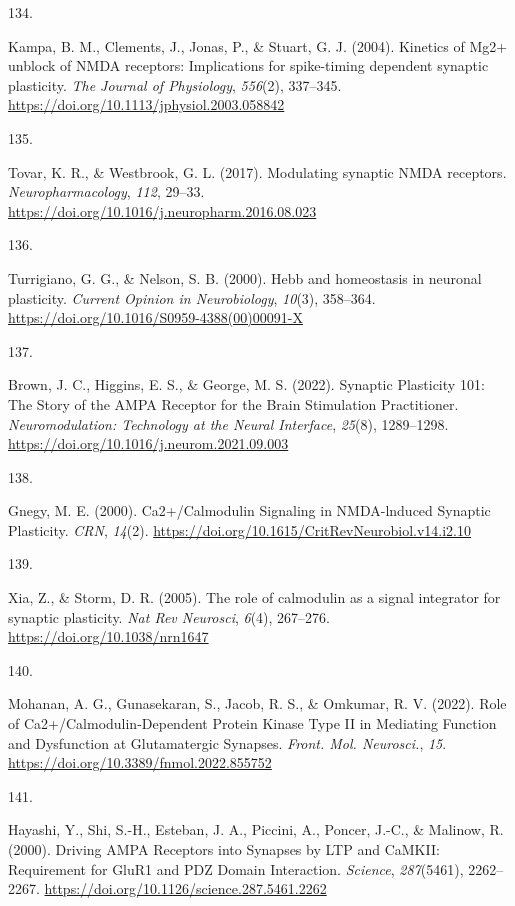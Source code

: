 \documentclass[
  11pt,
  letterpaper,
]{scrreprt}
\newlength{\cslhangindent}
\newlength{\csllabelwidth}
\newenvironment{CSLReferences}[2] %
 {\begin{list}{}{%
  \setlength{\itemindent}{0pt}
  \setlength{\leftmargin}{0pt}
  \setlength{\parsep}{0pt}
  \ifodd #1
   \setlength{\leftmargin}{\cslhangindent}
   \setlength{\itemindent}{-1\cslhangindent}
  \fi
  \setlength{\itemsep}{#2\baselineskip}}}
 {\end{list}}
\newcommand{\CSLLeftMargin}[1]{\parbox[t]{\csllabelwidth}{\strut#1\strut}}
\newcommand{\CSLRightInline}[1]{\parbox[t]{\linewidth - \csllabelwidth}{\strut#1\strut}}
\begin{document}
\begin{CSLReferences}{0}{0}
\CSLLeftMargin{134. }%
\CSLRightInline{Kampa, B. M., Clements, J., Jonas, P., \& Stuart, G. J.
(2004). Kinetics of {Mg2}+ unblock of {NMDA} receptors: Implications for
spike-timing dependent synaptic plasticity. \emph{The Journal of
Physiology}, \emph{556}(2), 337--345.
\url{https://doi.org/10.1113/jphysiol.2003.058842}}

\CSLLeftMargin{135. }%
\CSLRightInline{Tovar, K. R., \& Westbrook, G. L. (2017). Modulating
synaptic {NMDA} receptors. \emph{Neuropharmacology}, \emph{112}, 29--33.
\url{https://doi.org/10.1016/j.neuropharm.2016.08.023}}

\CSLLeftMargin{136. }%
\CSLRightInline{Turrigiano, G. G., \& Nelson, S. B. (2000). Hebb and
homeostasis in neuronal plasticity. \emph{Current Opinion in
Neurobiology}, \emph{10}(3), 358--364.
\url{https://doi.org/10.1016/S0959-4388(00)00091-X}}

\CSLLeftMargin{137. }%
\CSLRightInline{Brown, J. C., Higgins, E. S., \& George, M. S. (2022).
Synaptic {Plasticity} 101: {The Story} of the {AMPA Receptor} for the
{Brain Stimulation Practitioner}. \emph{Neuromodulation: Technology at
the Neural Interface}, \emph{25}(8), 1289--1298.
\url{https://doi.org/10.1016/j.neurom.2021.09.003}}

\CSLLeftMargin{138. }%
\CSLRightInline{Gnegy, M. E. (2000). Ca2+/{Calmodulin Signaling} in
{NMDA-lnduced Synaptic Plasticity}. \emph{CRN}, \emph{14}(2).
\url{https://doi.org/10.1615/CritRevNeurobiol.v14.i2.10}}

\CSLLeftMargin{139. }%
\CSLRightInline{Xia, Z., \& Storm, D. R. (2005). The role of calmodulin
as a signal integrator for synaptic plasticity. \emph{Nat Rev Neurosci},
\emph{6}(4), 267--276. \url{https://doi.org/10.1038/nrn1647}}

\CSLLeftMargin{140. }%
\CSLRightInline{Mohanan, A. G., Gunasekaran, S., Jacob, R. S., \&
Omkumar, R. V. (2022). Role of {Ca2}+/{Calmodulin-Dependent Protein
Kinase Type II} in {Mediating Function} and {Dysfunction} at
{Glutamatergic Synapses}. \emph{Front. Mol. Neurosci.}, \emph{15}.
\url{https://doi.org/10.3389/fnmol.2022.855752}}

\CSLLeftMargin{141. }%
\CSLRightInline{Hayashi, Y., Shi, S.-H., Esteban, J. A., Piccini, A.,
Poncer, J.-C., \& Malinow, R. (2000). Driving {AMPA Receptors} into
{Synapses} by {LTP} and {CaMKII}: {Requirement} for {GluR1} and {PDZ
Domain Interaction}. \emph{Science}, \emph{287}(5461), 2262--2267.
\url{https://doi.org/10.1126/science.287.5461.2262}}


\end{CSLReferences}
\end{document}

